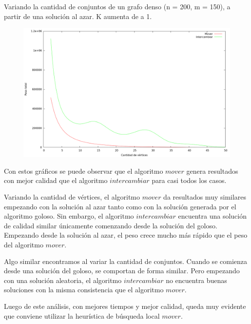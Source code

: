 Variando la cantidad de conjuntos de un grafo denso (n = 200, m = 150), a partir
de una solución al azar. K aumenta de a 1.
\vspace*{0.5cm}

\begin{figure}[h]
  \begin{center}
    \includegraphics[scale=0.35]{imagenes/local-random-k-peso.png}
  \end{center}
\end{figure}

\vspace*{0.5cm}

Con estos gráficos se puede observar que el algoritmo $mover$ genera resultados
con mejor calidad que el algoritmo $intercambiar$ para casi todos los casos.

Variando la cantidad de vértices, el algoritmo $mover$ da resultados muy similares
empezando con la solución al azar tanto como con la solución generada por el
algoritmo goloso. Sin embargo, el algoritmo $intercambiar$ encuentra una solución
de calidad similar únicamente comenzando desde la solución del goloso.
Empezando desde la solución al azar, el peso crece mucho más rápido que el peso
del algoritmo $mover$.

Algo similar encontramos al variar la cantidad de conjuntos. Cuando se comienza
desde una solución del goloso, se comportan de forma similar. Pero empezando con
una solución aleatoria, el algoritmo $intercambiar$ no encuentra buenas soluciones
con la misma consistencia que el algoritmo $mover$.

Luego de este análisis, con mejores tiempos y mejor calidad, queda muy evidente
que conviene utilizar la heurística de búsqueda local $mover$.
